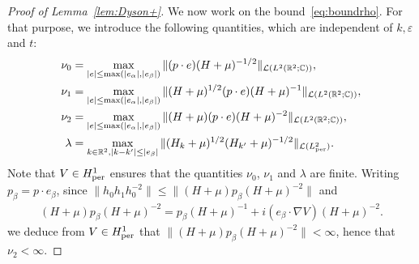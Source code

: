 \documentclass[a4paper,11pt]{article}
\theoremstyle{plain}
\theoremstyle{remark}
\def\R{{\mathbb R}}
\def\C{{\mathbb C}}
\def\eps{{\varepsilon}}
\def\cL{{\mathcal L}}
\begin{document}
\begin{proof}[Proof of Lemma~\ref{lem:Dyson+}]
We now work on the bound~\eqref{eq:boundrho}. For that purpose, we introduce the following
quantities, which are independent of $k, \eps$ and $t$:
\begin{align*}
\nu_0 &= \max_{|e|\le\max(|e_\alpha|,|e_\beta|)} \| (p\cdot e) (H+\mu)^{-1/2}\|_{\cL(L^2(\R^2;\C))}, \\
\nu_1&=  \max_{|e|\le\max(|e_\alpha|,|e_\beta|)} \|(H+\mu)^{1/2} (p\cdot e) (H+\mu)^{-1} \|_{\cL(L^2(\R^2;\C))}, \\
\nu_2&=  \max_{|e|\le\max(|e_\alpha|,|e_\beta|)} \|(H+\mu) (p\cdot e) (H+\mu)^{-2}\|_{\cL(L^2(\R^2;\C))},
\\ \lambda&=\max_{k \in \R^2,|k-k'| \le |e_\beta|}\|(H_k+\mu)^{1/2}(H_{k'}+\mu)^{-1/2}\|_{\cL(L^2_{\rm per})}.
\end{align*}
Note that $V\in H^1_{\rm per}$ ensures that
the quantities $\nu_0$, $\nu_1$ and $\lambda$ are finite. Writing $p_\beta=p\cdot e_\beta$, since
$\|h_0h_1h_0^{-2}\| \le \|(H+\mu)p_\beta (H+\mu)^{-2}\|$ and
\begin{align*}
(H+\mu)p_\beta (H+\mu)^{-2}
= p_\beta (H+\mu)^{-1}+i(e_\beta\cdot\nabla V)(H+\mu)^{-2}.
\end{align*}
we deduce from $V\in H_{\rm per}^{1}$ that $ \|(H+\mu)p_\beta (H+\mu)^{-2}\| < \infty$, hence that $\nu_2 < \infty$.

\medskip


\end{proof}
\end{document}
